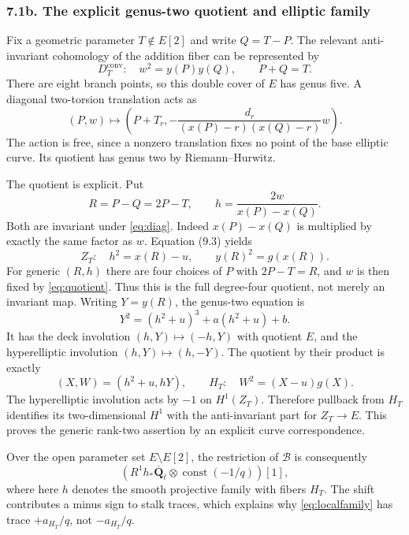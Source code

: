 \documentclass[
  11pt,
  a4paper,
]{article}
\newcommand{\Q}{\overline{\mathbf Q}_{\ell}}
\newcommand{\const}{\operatorname{const}}
\newcommand{\B}{\mathcal B}
\begin{document}
\subsubsection{7.1b. The explicit genus-two quotient and elliptic family}
Fix a geometric parameter $T\notin E[2]$ and write $Q=T-P$. The relevant anti-invariant cohomology of the addition fiber can be represented by
\begin{equation}
 D_T^{\mathrm{conv}}:\quad w^2=y(P)y(Q),\qquad P+Q=T.
\end{equation}
There are eight branch points, so this double cover of $E$ has genus five. A diagonal two-torsion translation acts as
\begin{equation}\label{eq:diag}
 (P,w)\longmapsto
 \left(P+T_r,-\frac{d_r}{(x(P)-r)(x(Q)-r)}w\right).
\end{equation}
The action is free, since a nonzero translation fixes no point of the base elliptic curve. Its quotient has genus two by Riemann--Hurwitz.

The quotient is explicit. Put
\begin{equation}\label{eq:quotient}
 R=P-Q=2P-T,\qquad h=\frac{2w}{x(P)-x(Q)}.
\end{equation}
Both are invariant under \eqref{eq:diag}. Indeed $x(P)-x(Q)$ is multiplied by exactly the same factor as $w$. Equation (9.3) yields
\begin{equation}\label{eq:genus2}
 Z_T:\quad h^2=x(R)-u,\qquad y(R)^2=g(x(R)).
\end{equation}
For generic $(R,h)$ there are four choices of $P$ with $2P-T=R$, and $w$ is then fixed by \eqref{eq:quotient}. Thus this is the full degree-four quotient, not merely an invariant map. Writing $Y=y(R)$, the genus-two equation is
\begin{equation}
 Y^2=(h^2+u)^3+a(h^2+u)+b.
\end{equation}
It has the deck involution $(h,Y)\mapsto(-h,Y)$ with quotient $E$, and the hyperelliptic involution $(h,Y)\mapsto(h,-Y)$. The quotient by their product is exactly
\begin{equation}
 (X,W)=(h^2+u,hY),\qquad H_T:\quad W^2=(X-u)g(X).
\end{equation}
The hyperelliptic involution acts by $-1$ on $H^1(Z_T)$. Therefore pullback from $H_T$ identifies its two-dimensional $H^1$ with the anti-invariant part for $Z_T\to E$. This proves the generic rank-two assertion by an explicit curve correspondence.

Over the open parameter set $E\setminus E[2]$, the restriction of $\B$ is consequently
\begin{equation}\label{eq:localfamily}
 \left(R^1h_*\Q\otimes\const(-1/q)\right)[1],
\end{equation}
where here $h$ denotes the smooth projective family with fibers $H_T$. The shift contributes a minus sign to stalk traces, which explains why \eqref{eq:localfamily} has trace $+a_{H_T}/q$, not $-a_{H_T}/q$.
\end{document}
